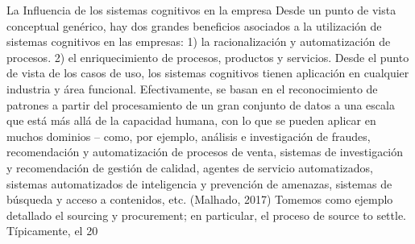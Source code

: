La Influencia de los sistemas cognitivos en la empresa
Desde un punto de vista conceptual genérico, hay dos grandes beneficios asociados a la utilización de sistemas cognitivos en las empresas: 
1) la racionalización y automatización de procesos.
2) el enriquecimiento de procesos, productos y servicios.
Desde el punto de vista de los casos de uso, los sistemas cognitivos tienen aplicación en cualquier industria y área funcional. Efectivamente, se basan en el reconocimiento de patrones a partir del procesamiento de un gran conjunto de datos a una escala que está más allá de la capacidad humana, con lo que se pueden aplicar en muchos dominios – como, por ejemplo, análisis e investigación de fraudes, recomendación y automatización de procesos de venta, sistemas de investigación y recomendación de gestión de calidad, agentes de servicio automatizados, sistemas automatizados de inteligencia y prevención de amenazas, sistemas de búsqueda y acceso a contenidos, etc. (Malhado, 2017)
Tomemos como ejemplo detallado el sourcing y procurement; en particular, el proceso de source to settle. Típicamente, el 20%

